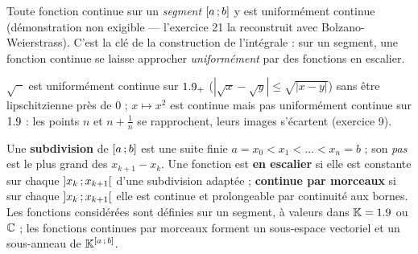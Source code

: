 \begin{theoreme}[Heine]
Toute fonction continue sur un \emph{segment} $\mathopen{[}a\,{;}\,b\mathclose{]}$ y est
uniformément continue (démonstration non exigible — l'exercice 21 la
reconstruit avec Bolzano-Weierstrass). C'est la clé de la construction de
l'intégrale : sur un segment, une fonction continue se laisse approcher
\emph{uniformément} par des fonctions en escalier.
\end{theoreme}

\begin{exemple}
$\sqrt{\phantom{x}}$ est uniformément continue sur $1.9_{+}$
($|\sqrt x-\sqrt y|\leqslant\sqrt{|x-y|}$) sans être lipschitzienne près de
$0$ ; $x\mapsto x^{2}$ est continue mais pas uniformément continue sur
$1.9$ : les points $n$ et $n+\frac1n$ se rapprochent, leurs images s'écartent
(exercice 9).
\end{exemple}


\begin{definition}
Une \textbf{subdivision} de $\mathopen{[}a\,{;}\,b\mathclose{]}$ est une suite finie
$a=x_0<x_1<\dots<x_n=b$ ; son \emph{pas} est le plus grand des
$x_{k+1}-x_k$. Une fonction est \textbf{en escalier} si elle est constante
sur chaque $\mathopen{]}x_k\,{;}\,x_{k+1}\mathclose{[}$ d'une subdivision adaptée ;
\textbf{continue par morceaux} si sur chaque $\mathopen{]}x_k\,{;}\,x_{k+1}\mathclose{[}$ elle
est continue et prolongeable par continuité aux bornes. Les fonctions
considérées sont définies sur un segment, à valeurs dans $\mathbb{K}=1.9$ ou $\mathbb{C}$ ;
les fonctions continues par morceaux forment un sous-espace vectoriel et un
sous-anneau de $\mathbb{K}^{\mathopen{[}a\,{;}\,b\mathclose{]}}$.
\end{definition}


